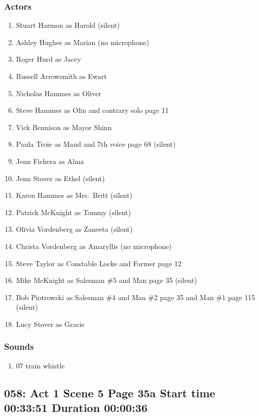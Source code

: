 \subsubsection{Actors}
\begin{enumerate}
\item Stuart Harmon as Harold (silent)
\item Ashley Hughes as Marian (no microphone)
\item Roger Hurd as Jacey
\item Russell Arrowsmith as Ewart
\item Nicholas Hammes as Oliver
\item Steve Hammes as Olin and contrary solo page 11
\item Vick Bennison as Mayor Shinn
\item Paula Troie as Maud and 7th voice page 68 (silent)
\item Jenn Fichera as Alma
\item Jenn Stover as Ethel (silent)
\item Karen Hammes as Mrs.~Britt (silent)
\item Patrick McKnight as Tommy (silent)
\item Olivia Vordenberg as Zaneeta (silent)
\item Christa Vordenberg as Amaryllis (no microphone)
\item Steve Taylor as Constable Locke and Farmer page 12
\item Mike McKnight as Salesman \#5 and Man page 35 (silent)
\item Bob Piotrowski as Salesman \#4 and Man \#2 page 35 and Man \#1 page 115 (silent)
\item Lucy Stover as Gracie
\end{enumerate}

\subsubsection{Sounds}
\begin{enumerate}
\item 07 train whistle
\end{enumerate}
\subsection{058: Act 1 Scene 5 Page 35a Start time 00:33:51 Duration 00:00:36}


